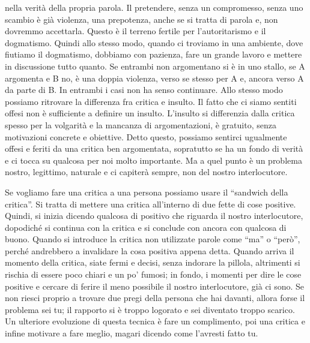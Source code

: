 \documentclass[12pt]{book} %
\begin{document}
nella verità della propria parola. Il pretendere, senza un compromesso, senza uno scambio è già violenza, una
prepotenza, anche se si tratta di parola e, non dovremmo accettarla. Questo è il terreno fertile per
l'autoritarismo e il dogmatismo. Quindi allo stesso modo, quando ci troviamo in una ambiente, dove
fiutiamo il dogmatismo, dobbiamo con pazienza, fare un grande lavoro e mettere in discussione tutto quanto. Se entrambi
non argomentano si è in uno stallo, se A argomenta e B no, è una doppia violenza, verso se stesso per A e, ancora verso
A da parte di B. In entrambi i casi non ha senso continuare. Allo stesso modo possiamo ritrovare la differenza fra
critica e insulto. Il fatto che ci siamo sentiti offesi non è sufficiente a definire un insulto.
L'insulto si differenzia dalla critica spesso per la volgarità e la mancanza di argomentazioni, è
gratuito, senza motivazioni concrete e obiettive. Detto questo, possiamo sentirci ugualmente offesi e feriti da una
critica ben argomentata, sopratutto se ha un fondo di verità e ci tocca su qualcosa per noi molto importante. Ma a quel
punto è un problema nostro, legittimo, naturale e ci capiterà sempre, non del nostro interlocutore. 


\bigskip

Se vogliamo fare una critica a una persona possiamo usare il “sandwich della critica”. Si tratta di mettere una critica
all'interno di due fette di cose positive. Quindi, si inizia dicendo qualcosa di positivo che
riguarda il nostro interlocutore, dopodiché si continua con la critica e si conclude con ancora con qualcosa di buono.
Quando si introduce la critica non utilizzate parole come “ma” o “però”, perché andrebbero a invalidare la cosa
positiva appena detta. Quando arriva il momento della critica, siate fermi e decisi, senza indorare la pillola,
altrimenti si rischia di essere poco chiari e un po' fumosi; in fondo, i momenti per dire le cose
positive e cercare di ferire il meno possibile il nostro interlocutore, già ci sono. Se non riesci proprio a trovare
due pregi della persona che hai davanti, allora forse il problema sei tu; il rapporto si è troppo logorato e sei
diventato troppo scarico. Un ulteriore evoluzione di questa tecnica è fare un complimento, poi una critica e infine
motivare a fare meglio, magari dicendo come l'avresti fatto tu.


\bigskip
\end{document}
